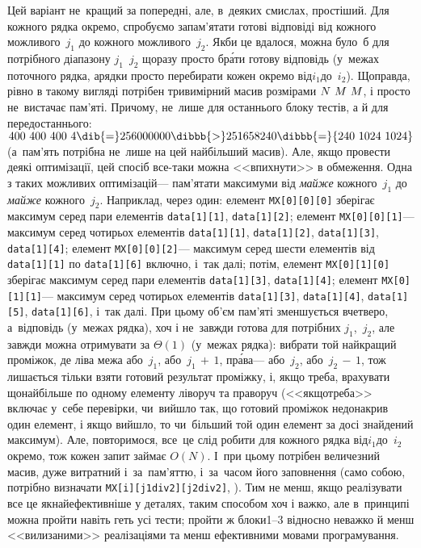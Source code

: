 Цей варіант не~кращий за попередні, але, в~деяких смислах, простіший.
Для кожного рядка окремо, спробуємо запам'ятати готові відповіді від кожного можливого~$j_1$ до кожного можливого~$j_2$. Якби це вдалося, можна було~б для потрібного діапазону $j_1$~$j_2$ щоразу просто бр\'{а}ти готову відповідь (у~межах поточного рядка, а\nolinebreak[3] рядки просто перебирати кожен окремо від\nolinebreak[3] $i_1$\nolinebreak[2] до~$i_2$). 
Щоправда, рівно в такому вигляді потрібен тривимірний масив розмірами ${N\,{\*}\,M\,{\*}\,M}$, і просто не~вистачає пам'яті. Причому, не~лише для останнього блоку тестів, а й для передостаннього: ${400\,{\*}\,400\,{\*}\,400\,{\*}\,4}\dib{{=}}256000000\dibbb{{>}}251658240\dibbb{{=}}{240\,{\*}\,1024\,{\*}\,1024}$ (а~пам'ять потрібна не~лише на цей найбільший масив). Але, якщо провести деякі оптимізації, цей спосіб все-таки можна <<впихнути>> в обмеження. Одна з таких можливих оптимізацій\nolinebreak[3] --- пам'ятати максимуми від \emph{майже} кожного~$j_1$ до \emph{майже} кожного~$j_2$. Наприклад, через один: елемент \texttt{MX[0][0][0]} зберігає максимум серед пари елементів \texttt{data[1][1]}, \texttt{data[1][2]}; елемент \texttt{MX[0][0][1]}\nolinebreak[3] --- максимум серед чотирьох елементів \texttt{data[1][1]}, \texttt{data[1][2]}, \texttt{data[1][3]}, \texttt{data[1][4]}; елемент \texttt{MX[0][0][2]}\nolinebreak[3] --- максимум серед шести елементів від \texttt{data[1][1]} по \texttt{data[1][6]} включно, і~так далі; потім, елемент \texttt{MX[0][1][0]} зберігає максимум серед пари елементів \texttt{data[1][3]}, \texttt{data[1][4]}; елемент \texttt{MX[0][1][1]}\nolinebreak[3] --- максимум серед чотирьох елементів \texttt{data[1][3]}, \texttt{data[1][4]}, \texttt{data[1][5]}, \texttt{data[1][6]}, і~так далі. При цьому об'єм пам'яті зменшується вчетверо, а~відповідь (у~межах рядка), хоч і не~завжди готова для потрібних $j_1$,~$j_2$, але завжди можна отримувати за $\Theta(1)$ (у~межах рядка): вибрати той найкращий проміжок, де ліва межа або~$j_1$, або~${j_1\,{+}\,1}$, пр\'{а}ва\nolinebreak[3] --- або~$j_2$, або~${j_2\,{-}\,1}$, тож лишається тільки взяти готовий результат проміжку, і, якщо треба, врахувати щонайбільше по одному елементу ліворуч та праворуч  (<<\mbox{якщо}\nolinebreak[2] треба>> включає у~себе перевірки, чи~вийшло так, що готовий проміжок недонакрив один елемент, і якщо вийшло, то чи~більший той один елемент за досі знайдений максимум). Але, повторимося, все~це слід робити для кожного рядка від\nolinebreak[3] $i_1$\nolinebreak[2] до~$i_2$ окремо, тож кожен запит займає $O(N)$. І~при цьому потрібен величезний масив, дуже витратний і~за~пам'яттю, і~за~часом його заповнення (само собою, потрібно визначати \texttt{MX[i][j1div2][j2div2]}, ). 
% 
Тим не менш, якщо реалізувати все це якнайефективніше у деталях, таким способом хоч і важко, але в~принципі можна пройти навіть геть усі тести; пройти ж блоки\nolinebreak[3] \mbox{1--3} відносно неважко й менш <<вилизаними>> реалізаціями та менш ефективними мовами програмування.

